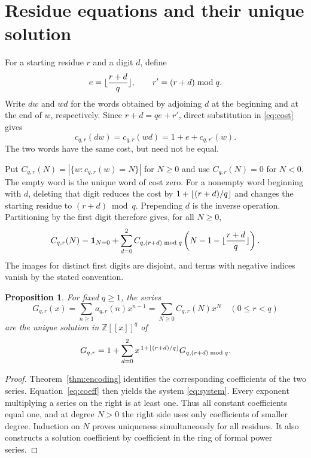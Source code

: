 \documentclass[11pt,a4paper]{article}
\newtheorem{proposition}[theorem]{Proposition}
\theoremstyle{remark}
\newcommand{\Z}{\mathbb Z}
\DeclarePairedDelimiter{\floor}{\lfloor}{\rfloor}
\begin{document}
\section{Residue equations and their unique solution}

For a starting residue $r$ and a digit $d$, define
\begin{equation}\label{eq:carry}
 e=\floor{\frac{r+d}{q}},\qquad r'=(r+d)\bmod q.
\end{equation}
Write $dw$ and $wd$ for the words obtained by adjoining $d$ at the
beginning and at the end of $w$, respectively. Since $r+d=qe+r'$, direct
substitution in \eqref{eq:cost} gives
\begin{equation}\label{eq:digit}
 c_{q,r}(dw)=c_{q,r}(wd)
     =1+e+c_{q,r'}(w).
\end{equation}
The two words have the same cost, but need not be equal.

Put $C_{q,r}(N)=|\{w:c_{q,r}(w)=N\}|$ for $N\ge0$ and use
$C_{q,r}(N)=0$ for $N<0$.
The empty word is the unique word of cost zero. For a nonempty word
beginning with $d$, deleting that digit reduces the cost by
$1+\floor{(r+d)/q}$ and changes the starting residue to $(r+d)\bmod q$.
Prepending $d$ is the inverse operation. Partitioning by the first digit
therefore gives, for all $N\ge0$,
\begin{equation}\label{eq:coeff}
 C_{q,r}(N)=\mathbf1_{N=0}+
   \sum_{d=0}^2 C_{q,(r+d)\bmod q}
       \left(N-1-\floor{\frac{r+d}{q}}\right).
\end{equation}
The images for distinct first digits are disjoint, and terms with negative
indices vanish by the stated convention.

\begin{proposition}\label{prop:system}
For fixed $q\ge1$, the series
\[
 G_{q,r}(x)=\sum_{n\ge1}a_{q,r}(n)x^{n-1}
           =\sum_{N\ge0}C_{q,r}(N)x^N\quad(0\le r<q)
\]
are the unique solution in $\Z[[x]]^q$ of
\begin{equation}\label{eq:system}
 G_{q,r}=1+\sum_{d=0}^2
 x^{\,1+\floor{(r+d)/q}}G_{q,(r+d)\bmod q}.
\end{equation}
\end{proposition}

\begin{proof}
Theorem~\ref{thm:encoding} identifies the corresponding coefficients of
the two series. Equation~\eqref{eq:coeff} then yields the system
\eqref{eq:system}.
Every exponent multiplying a series on the right is at least one. Thus
all constant coefficients equal one, and at degree $N>0$ the right side
uses only coefficients of smaller degree. Induction on $N$ proves
uniqueness simultaneously for all residues. It also constructs a solution
coefficient by coefficient in the ring of formal power series.
\end{proof}
\end{document}
